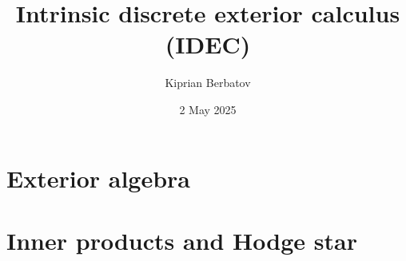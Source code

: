 \documentclass{article}
\title{Intrinsic discrete exterior calculus (IDEC)}
\author{Kiprian Berbatov}
\date{2 May 2025}
\theoremstyle{definition}
\begin{document}

\maketitle

\tableofcontents
\NewCommandCopy\oricontentsline\contentsline
\makeatletter
\RenewDocumentCommand{}
{%
  {\let\numberline\@gobble
    }%
}
\makeatother

\listoffigures

\listoftables


\section{Exterior algebra}
\label{section:exterior_algebra}
















\section{Inner products and Hodge star}
\label{section:inner_products_and_hodge_star}










\end{document}

